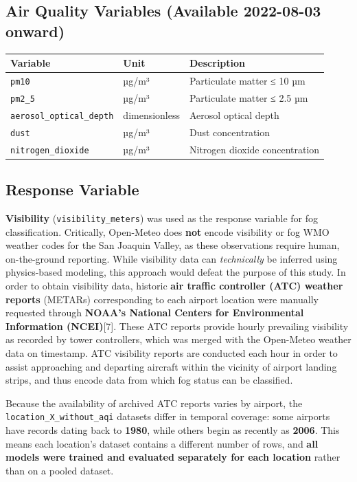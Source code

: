 \documentclass[
  letterpaper,
  DIV=11,
  numbers=noendperiod]{scrartcl}
\begin{document}
\subsection{Air Quality Variables (Available 2022-08-03
onward)}\label{air-quality-variables-available-2022-08-03-onward}

\begin{longtable}[]{@{}lll@{}}
\toprule\noalign{}
Variable & Unit & Description \\
\midrule\noalign{}
\endhead
\bottomrule\noalign{}
\endlastfoot
\texttt{pm10} & µg/m³ & Particulate matter ≤ 10 µm \\
\texttt{pm2\_5} & µg/m³ & Particulate matter ≤ 2.5 µm \\
\texttt{aerosol\_optical\_depth} & dimensionless & Aerosol optical
depth \\
\texttt{dust} & µg/m³ & Dust concentration \\
\texttt{nitrogen\_dioxide} & µg/m³ & Nitrogen dioxide concentration \\
\end{longtable}

\subsection{Response Variable}\label{response-variable}

\textbf{Visibility} (\texttt{visibility\_meters}) was used as the
response variable for fog classification. Critically, Open-Meteo does
\textbf{not} encode visibility or fog WMO weather codes for the San
Joaquin Valley, as these observations require human, on-the-ground
reporting. While visibility data can \emph{technically} be inferred
using physics-based modeling, this approach would defeat the purpose of
this study. In order to obtain visibility data, historic \textbf{air
traffic controller (ATC) weather reports} (METARs) corresponding to each
airport location were manually requested through \textbf{NOAA's National
Centers for Environmental Information (NCEI)}{[}7{]}. These ATC reports
provide hourly prevailing visibility as recorded by tower controllers,
which was merged with the Open-Meteo weather data on timestamp. ATC
visibility reports are conducted each hour in order to assist
approaching and departing aircraft within the vicinity of airport
landing strips, and thus encode data from which fog status can be
classified.

Because the availability of archived ATC reports varies by airport, the
\texttt{location\_X\_without\_aqi} datasets differ in temporal coverage:
some airports have records dating back to \textbf{1980}, while others
begin as recently as \textbf{2006}. This means each location's dataset
contains a different number of rows, and \textbf{all models were trained
and evaluated separately for each location} rather than on a pooled
dataset.
\end{document}
